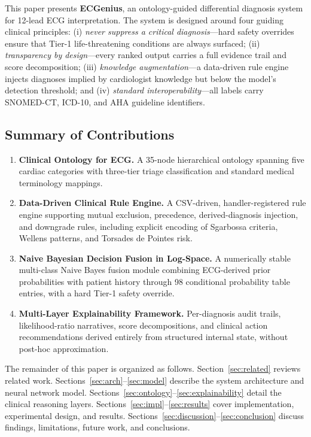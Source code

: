\documentclass[journal]{IEEEtran}
\begin{document}
This paper presents \textbf{ECGenius}, an ontology-guided differential
diagnosis system for 12-lead ECG interpretation.
The system is designed around four guiding clinical principles:
(i) \emph{never suppress a critical diagnosis}—hard safety overrides
ensure that Tier-1 life-threatening conditions are always surfaced;
(ii) \emph{transparency by design}—every ranked output carries a
full evidence trail and score decomposition;
(iii) \emph{knowledge augmentation}—a data-driven rule engine injects
diagnoses implied by cardiologist knowledge but below the model's
detection threshold; and
(iv) \emph{standard interoperability}—all labels carry SNOMED-CT,
ICD-10, and AHA guideline identifiers.

\subsection*{Summary of Contributions}

\begin{enumerate}
  \item \textbf{Clinical Ontology for ECG.}
        A 35-node hierarchical ontology spanning five cardiac
        categories with three-tier triage classification and
        standard medical terminology mappings.

  \item \textbf{Data-Driven Clinical Rule Engine.}
        A CSV-driven, handler-registered rule engine supporting
        mutual exclusion, precedence, derived-diagnosis injection,
        and downgrade rules, including explicit encoding of
        Sgarbossa criteria, Wellens patterns, and Torsades de
        Pointes risk.

  \item \textbf{Naive Bayesian Decision Fusion in Log-Space.}
        A numerically stable multi-class Naive Bayes fusion module
        combining ECG-derived prior probabilities with patient
        history through 98 conditional probability table entries,
        with a hard Tier-1 safety override.

  \item \textbf{Multi-Layer Explainability Framework.}
        Per-diagnosis audit trails, likelihood-ratio narratives,
        score decompositions, and clinical action recommendations
        derived entirely from structured internal state, without
        post-hoc approximation.
\end{enumerate}

The remainder of this paper is organized as follows.
Section~\ref{sec:related} reviews related work.
Sections~\ref{sec:arch}--\ref{sec:model} describe the system
architecture and neural network model.
Sections~\ref{sec:ontology}--\ref{sec:explainability} detail the
clinical reasoning layers.
Sections~\ref{sec:impl}--\ref{sec:results} cover implementation,
experimental design, and results.
Sections~\ref{sec:discussion}--\ref{sec:conclusion} discuss findings,
limitations, future work, and conclusions.
\end{document}
